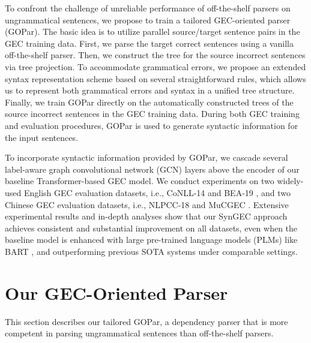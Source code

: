 \documentclass[11pt]{article}
\begin{document}
To confront the challenge of unreliable performance of off-the-shelf parsers on ungrammatical sentences, 
we propose to train a tailored GEC-oriented parser (GOPar). The basic idea is to utilize parallel source/target sentence pairs in the GEC training data. First, we parse the target correct sentences using a vanilla off-the-shelf parser. Then, we construct the tree for the source incorrect sentences via tree projection. 
To accommodate grammatical errors, we propose an extended syntax representation scheme based on several straightforward rules, which allows us to represent both grammatical errors and syntax in a unified tree structure. 
Finally, we train GOPar directly on the automatically constructed trees of the source incorrect sentences in the GEC training data. 
During both GEC training and evaluation procedures, GOPar is used to generate syntactic information for the input sentences. 





To incorporate syntactic information provided by GOPar, we cascade several label-aware graph convolutional network (GCN) layers  \citep{DBLP:conf/iclr/KipfW17, DBLP:conf/acl/ZhangZWLZ20} above the encoder of our baseline Transformer-based GEC model. 
We conduct experiments on two widely-used English GEC evaluation datasets, i.e., CoNLL-14 \citep{ng2014conll} and BEA-19 \citep{bryant2019bea}, and two Chinese GEC evaluation datasets, i.e., NLPCC-18 \cite{zhao2018overview} and MuCGEC \citep{zhang2022mucgec}. Extensive experimental results and in-depth analyses show that our 
SynGEC approach achieves consistent and substantial  improvement on all datasets, even when the baseline model is enhanced with large pre-trained language models (PLMs) like BART \citep{lewis2020bart}, and outperforming previous SOTA systems under comparable settings.













 


\section{Our GEC-Oriented Parser}
\label{sec:parsing:data}


This section describes our tailored GOPar, a dependency parser that is more competent in parsing ungrammatical sentences than off-the-shelf parsers. 
\end{document}
